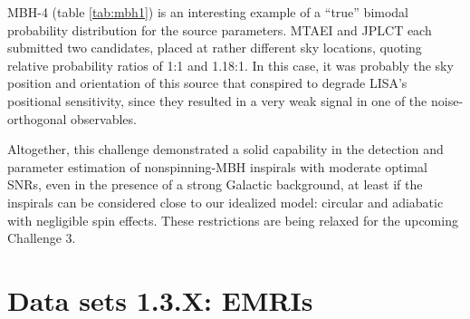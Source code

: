 \documentclass{iopart}
\begin{document}
MBH-4 (table \ref{tab:mbh1}) is an interesting example of a ``true'' bimodal probability distribution for the source parameters. MTAEI and JPLCT each submitted two candidates, placed at rather different sky locations, quoting relative probability ratios of 1:1 and 1.18:1. In this case, it was probably the sky position and orientation of this source that conspired to degrade LISA's positional sensitivity, since they resulted in a very weak signal in one of the noise-orthogonal observables.

Altogether, this challenge demonstrated a solid capability in the detection and parameter estimation of nonspinning-MBH inspirals with moderate optimal SNRs, even in the presence of a strong Galactic background, at least if the inspirals can be considered close to our idealized model: circular and adiabatic with negligible spin effects. These restrictions are being relaxed for the upcoming Challenge 3.

\section{Data sets 1.3.X: EMRIs}
\end{document}
